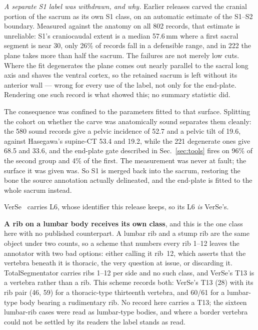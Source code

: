 \documentclass[aapm,mph,amsmath,amssymb,reprint]{revtex4-2}
\begin{document}
\emph{A separate S1 label was withdrawn, and why.} Earlier releases carved the cranial
portion of the sacrum as its own S1 class, on an automatic estimate of the S1--S2 boundary.
Measured against the anatomy on all 802 records, that estimate is unreliable: S1's
craniocaudal extent is a median 57.6\,mm where a first sacral segment is near 30, only 26\%
of records fall in a defensible range, and in 222 the plane takes more than half the sacrum.
The failures are not merely low cuts. Where the fit degenerates the plane comes out nearly
parallel to the sacral long axis and shaves the ventral cortex, so the retained sacrum is
left without its anterior wall --- wrong for every use of the label, not only for the
end-plate. Rendering one such record is what showed this; no summary statistic did.

The consequence was confined to the parameters fitted to that surface. Splitting the cohort
on whether the carve was anatomically sound separates them cleanly: the 580 sound records
give a pelvic incidence of 52.7\textdegree{} and a pelvic tilt of 19.6\textdegree{}, against
Hasegawa's supine-CT 53.4 and 19.2, while the 221 degenerate ones give 68.5 and 33.6, and
the end-plate gate described in Sec.~\ref{sec:tools} fires on 96\% of the second group and
4\% of the first. The measurement was never at fault; the surface it was given was. So S1 is
merged back into the sacrum, restoring the bone the source annotation actually delineated,
and the end-plate is fitted to the whole sacrum instead.

VerSe~\cite{verse2021} carries L6, whose identifier this release keeps, so its L6 \emph{is} VerSe's.

\textbf{A rib on a lumbar body receives its own class}, and this is the one class here with
no published counterpart. A lumbar rib and a stump rib are the same object under two counts,
so a scheme that numbers every rib 1--12 leaves the annotator with two bad options: either calling it rib~12,
which asserts that the vertebra beneath it is thoracic, the very question at issue, or discarding
it. TotalSegmentator carries ribs 1--12 per side and no such class, and
VerSe's T13 is a vertebra rather than a rib. This scheme records both: VerSe's T13 (28) with its rib pair (46, 59) for a thoracic-type
thirteenth vertebra, and 60/61 for a lumbar-type body bearing a rudimentary rib. No record here carries a T13; the sixteen lumbar-rib cases were read as lumbar-type
bodies, and where a border vertebra could not be settled by its readers the label stands as
read.
\end{document}
